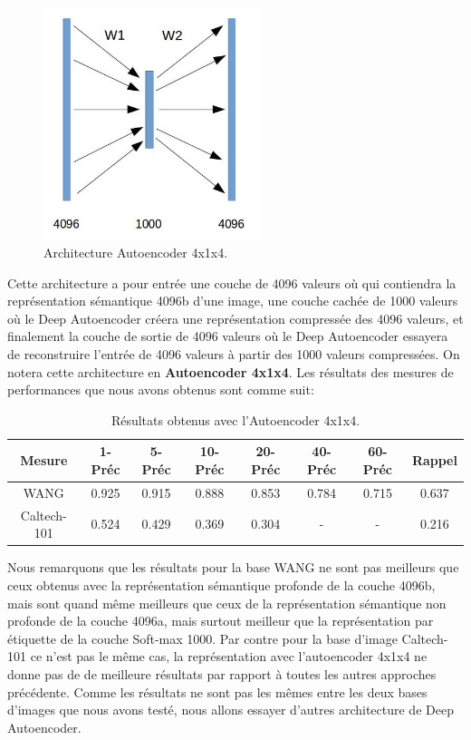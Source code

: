 \begin{figure}[H]
	\centering
		\includegraphics[width=2.5in]{Figures/ae/414.jpg}
	\caption[An Electron]{Architecture Autoencoder 4x1x4.}
	\label{fig:Electron}
\end{figure}

	Cette architecture a pour entrée une couche de 4096 valeurs où qui contiendra la représentation sémantique 4096b d'une image, une couche cachée de 1000 valeurs où le Deep Autoencoder créera une représentation compressée des 4096 valeurs, et finalement la couche de sortie de 4096 valeurs où le Deep Autoencoder essayera de reconstruire l'entrée de 4096 valeurs à partir des 1000 valeurs compressées. On notera cette architecture en \textbf{Autoencoder 4x1x4}. Les résultats des mesures de performances que nous avons obtenus sont comme suit:
	

\begin{table}[H]
\begin{center}
\begin{tabular}{|c|c|c|c|c|c|c|c|}
\hline
	Mesure & 1-Préc & 5-Préc & 10-Préc & 20-Préc & 40-Préc & 60-Préc & Rappel\\
\hline
	WANG & 0.925 & 0.915 & 0.888 & 0.853 & 0.784 & 0.715 & 0.637\\
\hline
	Caltech-101 & 0.524 & 0.429 & 0.369 & 0.304 & - & - & 0.216\\
\hline
\end{tabular}
\end{center}
\caption{Résultats obtenus avec l'Autoencoder 4x1x4.}
\end{table}

	Nous remarquons que les résultats pour la base WANG ne sont pas meilleurs que ceux obtenus avec la représentation sémantique profonde de la couche 4096b, mais sont quand même meilleurs que ceux de la représentation sémantique non profonde de la couche 4096a, mais surtout meilleur que la représentation par étiquette de la couche Soft-max 1000.
	Par contre pour la base d'image Caltech-101 ce n'est pas le même cas, la représentation avec l'autoencoder 4x1x4 ne donne pas de de meilleure résultats par rapport à toutes les autres approches précédente.
	Comme les résultats ne sont pas les mêmes entre les deux bases d'images que nous avons testé, nous allons essayer d'autres architecture de Deep Autoencoder.


